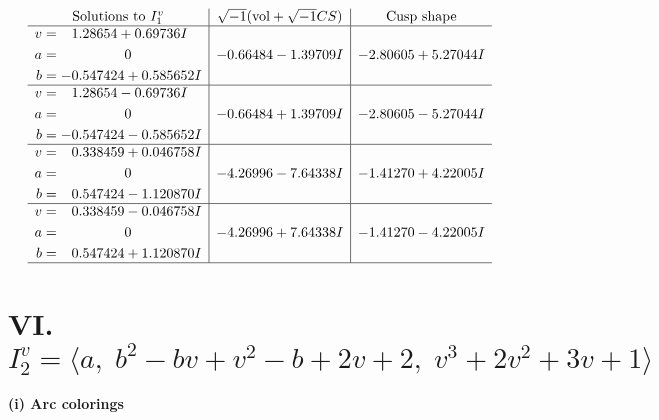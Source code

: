 \documentclass[1p]{elsarticle_modified}
\theoremstyle{definition}
\newcommand{\I}{\sqrt{-1}}
\begin{document}
$$\begin{array}{c|c|c}  
\text{Solutions to }I^v_{1}& \I (\text{vol} + \sqrt{-1}CS) & \text{Cusp shape}\\
 \hline 
\begin{aligned}
v &= \phantom{-}1.28654 + 0.69736 I \\
a &= \phantom{-0.000000 } 0 \\
b &= -0.547424 + 0.585652 I\end{aligned}
 & -0.66484 - 1.39709 I & -2.80605 + 5.27044 I \\ \hline\begin{aligned}
v &= \phantom{-}1.28654 - 0.69736 I \\
a &= \phantom{-0.000000 } 0 \\
b &= -0.547424 - 0.585652 I\end{aligned}
 & -0.66484 + 1.39709 I & -2.80605 - 5.27044 I \\ \hline\begin{aligned}
v &= \phantom{-}0.338459 + 0.046758 I \\
a &= \phantom{-0.000000 } 0 \\
b &= \phantom{-}0.547424 - 1.120870 I\end{aligned}
 & -4.26996 - 7.64338 I & -1.41270 + 4.22005 I \\ \hline\begin{aligned}
v &= \phantom{-}0.338459 - 0.046758 I \\
a &= \phantom{-0.000000 } 0 \\
b &= \phantom{-}0.547424 + 1.120870 I\end{aligned}
 & -4.26996 + 7.64338 I & -1.41270 - 4.22005 I\\
 \hline 
 \end{array}$$\newpage\newpage\renewcommand{\arraystretch}{1}
\centering \section*{VI. $I^v_{2}= \langle a,\;b^2- b v+v^2- b+2 v+2,\;v^3+2 v^2+3 v+1 \rangle$}
\flushleft \textbf{(i) Arc colorings}\\
\end{document}
